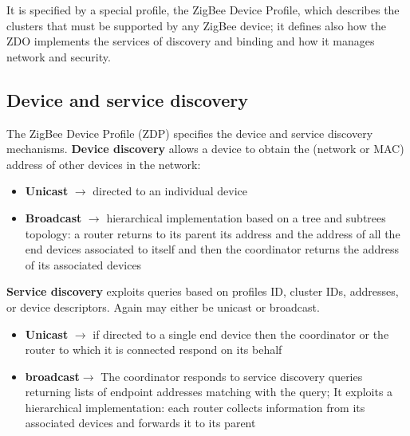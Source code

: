 It is specified by a special profile, the ZigBee Device
Profile, which describes the clusters that must be supported by any ZigBee device; it defines also how the ZDO implements the services of discovery and binding and how it manages network and security.

\subsection{Device and service discovery}
The ZigBee Device Profile (ZDP) specifies the device and
service discovery mechanisms.
\textbf{Device discovery} allows a device to obtain the (network or MAC) address of other devices in the network:
\begin{itemize}
   \item \textbf{Unicast} $\longrightarrow$ directed to an individual device
   \item \textbf{Broadcast} $\longrightarrow$ hierarchical implementation based on a tree and subtrees topology: a router returns to its parent its address and the address of all the
   end devices associated to itself and then the coordinator returns the address of its associated devices
\end{itemize}

\textbf{Service discovery} exploits queries based on profiles ID, cluster IDs, addresses, or device
descriptors. Again may either be unicast or broadcast.
\begin{itemize}
   \item \textbf{Unicast} $\longrightarrow$ if directed to a single end device then the coordinator or the router to which it is connected respond on its behalf
   \item \textbf{broadcast}$\longrightarrow$
   The coordinator responds to service discovery queries returning lists of endpoint addresses matching with the query;
   It exploits a hierarchical implementation: each router collects information from
   its associated devices and forwards it to its parent
\end{itemize}
   
